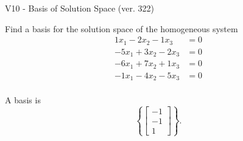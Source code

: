 \begin{exercise}
  \begin{exerciseTitle}V10 - Basis of Solution Space (ver. 322)\end{exerciseTitle}
  \begin{exerciseStatement}
    Find a basis for the solution space of the homogeneous system 
\begin{align*}
 1 x_ 1 -2 x_ 2 -1 x_ 3 &= 0  \\ 
  -5 x_ 1 + 3 x_ 2 -2 x_ 3 &= 0  \\ 
  -6 x_ 1 + 7 x_ 2 + 1 x_ 3 &= 0  \\ 
  -1 x_ 1 -4 x_ 2 -5 x_ 3 &= 0  \\ 
 \end{align*}


 
  \end{exerciseStatement}

  \begin{exerciseAnswer}
   A basis is   
\[\left\{\left[\begin{array}{c}
-1 \\
-1 \\
1
\end{array}\right]\right\}.\]

  


  \end{exerciseAnswer}
\end{exercise}